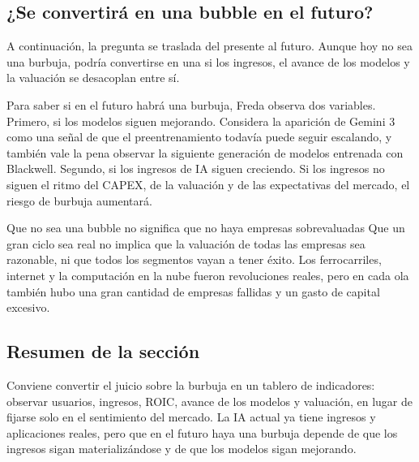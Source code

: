 \subsection{¿Se convertirá en una bubble en el futuro?}

A continuación, la pregunta se traslada del presente al futuro. Aunque hoy no sea una burbuja, podría convertirse en una si los ingresos, el avance de los modelos y la valuación se desacoplan entre sí.

Para saber si en el futuro habrá una burbuja, Freda observa dos variables. Primero, si los modelos siguen mejorando. Considera la aparición de Gemini 3 como una señal de que el preentrenamiento todavía puede seguir escalando, y también vale la pena observar la siguiente generación de modelos entrenada con Blackwell. Segundo, si los ingresos de IA siguen creciendo. Si los ingresos no siguen el ritmo del CAPEX, de la valuación y de las expectativas del mercado, el riesgo de burbuja aumentará.

\begin{warningbox}{Que no sea una bubble no significa que no haya empresas sobrevaluadas}
Que un gran ciclo sea real no implica que la valuación de todas las empresas sea razonable, ni que todos los segmentos vayan a tener éxito. Los ferrocarriles, internet y la computación en la nube fueron revoluciones reales, pero en cada ola también hubo una gran cantidad de empresas fallidas y un gasto de capital excesivo.
\end{warningbox}

\subsection{Resumen de la sección}

Conviene convertir el juicio sobre la burbuja en un tablero de indicadores: observar usuarios, ingresos, ROIC, avance de los modelos y valuación, en lugar de fijarse solo en el sentimiento del mercado. La IA actual ya tiene ingresos y aplicaciones reales, pero que en el futuro haya una burbuja depende de que los ingresos sigan materializándose y de que los modelos sigan mejorando.
